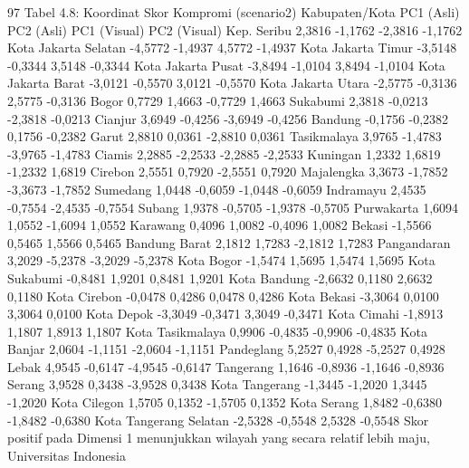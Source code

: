 97
Tabel 4.8: Koordinat Skor Kompromi (scenario2)
Kabupaten/Kota PC1 (Asli) PC2 (Asli) PC1 (Visual) PC2 (Visual)
Kep. Seribu 2,3816 -1,1762 -2,3816 -1,1762
Kota Jakarta Selatan -4,5772 -1,4937 4,5772 -1,4937
Kota Jakarta Timur -3,5148 -0,3344 3,5148 -0,3344
Kota Jakarta Pusat -3,8494 -1,0104 3,8494 -1,0104
Kota Jakarta Barat -3,0121 -0,5570 3,0121 -0,5570
Kota Jakarta Utara -2,5775 -0,3136 2,5775 -0,3136
Bogor 0,7729 1,4663 -0,7729 1,4663
Sukabumi 2,3818 -0,0213 -2,3818 -0,0213
Cianjur 3,6949 -0,4256 -3,6949 -0,4256
Bandung -0,1756 -0,2382 0,1756 -0,2382
Garut 2,8810 0,0361 -2,8810 0,0361
Tasikmalaya 3,9765 -1,4783 -3,9765 -1,4783
Ciamis 2,2885 -2,2533 -2,2885 -2,2533
Kuningan 1,2332 1,6819 -1,2332 1,6819
Cirebon 2,5551 0,7920 -2,5551 0,7920
Majalengka 3,3673 -1,7852 -3,3673 -1,7852
Sumedang 1,0448 -0,6059 -1,0448 -0,6059
Indramayu 2,4535 -0,7554 -2,4535 -0,7554
Subang 1,9378 -0,5705 -1,9378 -0,5705
Purwakarta 1,6094 1,0552 -1,6094 1,0552
Karawang 0,4096 1,0082 -0,4096 1,0082
Bekasi -1,5566 0,5465 1,5566 0,5465
Bandung Barat 2,1812 1,7283 -2,1812 1,7283
Pangandaran 3,2029 -5,2378 -3,2029 -5,2378
Kota Bogor -1,5474 1,5695 1,5474 1,5695
Kota Sukabumi -0,8481 1,9201 0,8481 1,9201
Kota Bandung -2,6632 0,1180 2,6632 0,1180
Kota Cirebon -0,0478 0,4286 0,0478 0,4286
Kota Bekasi -3,3064 0,0100 3,3064 0,0100
Kota Depok -3,3049 -0,3471 3,3049 -0,3471
Kota Cimahi -1,8913 1,1807 1,8913 1,1807
Kota Tasikmalaya 0,9906 -0,4835 -0,9906 -0,4835
Kota Banjar 2,0604 -1,1151 -2,0604 -1,1151
Pandeglang 5,2527 0,4928 -5,2527 0,4928
Lebak 4,9545 -0,6147 -4,9545 -0,6147
Tangerang 1,1646 -0,8936 -1,1646 -0,8936
Serang 3,9528 0,3438 -3,9528 0,3438
Kota Tangerang -1,3445 -1,2020 1,3445 -1,2020
Kota Cilegon 1,5705 0,1352 -1,5705 0,1352
Kota Serang 1,8482 -0,6380 -1,8482 -0,6380
Kota Tangerang Selatan -2,5328 -0,5548 2,5328 -0,5548
Skor positif pada Dimensi 1 menunjukkan wilayah yang secara relatif lebih maju,
Universitas Indonesia

